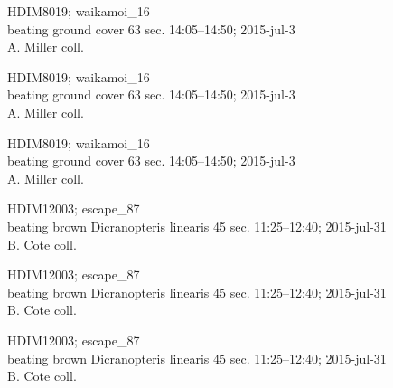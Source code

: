 \documentclass[2pt]{extarticle}
\begin{document}
\noindent
\parbox{0.16\textwidth}{\tiny \raggedright \rule[-0.3\baselineskip]{0pt}{10pt}HDIM8019; waikamoi\_16\\ beating ground cover 63 sec. 14:05--14:50; 2015-jul-3\\ A. Miller coll.}
\parbox{0.16\textwidth}{\tiny \raggedright \rule[-0.3\baselineskip]{0pt}{10pt}HDIM8019; waikamoi\_16\\ beating ground cover 63 sec. 14:05--14:50; 2015-jul-3\\ A. Miller coll.}
\parbox{0.16\textwidth}{\tiny \raggedright \rule[-0.3\baselineskip]{0pt}{10pt}HDIM8019; waikamoi\_16\\ beating ground cover 63 sec. 14:05--14:50; 2015-jul-3\\ A. Miller coll.}
\parbox{0.16\textwidth}{\tiny \raggedright \rule[-0.3\baselineskip]{0pt}{10pt}HDIM12003; escape\_87\\ beating brown Dicranopteris linearis 45 sec. 11:25--12:40; 2015-jul-31\\ B. Cote coll.}
\parbox{0.16\textwidth}{\tiny \raggedright \rule[-0.3\baselineskip]{0pt}{10pt}HDIM12003; escape\_87\\ beating brown Dicranopteris linearis 45 sec. 11:25--12:40; 2015-jul-31\\ B. Cote coll.}
\parbox{0.16\textwidth}{\tiny \raggedright \rule[-0.3\baselineskip]{0pt}{10pt}HDIM12003; escape\_87\\ beating brown Dicranopteris linearis 45 sec. 11:25--12:40; 2015-jul-31\\ B. Cote coll.} \\ 
\vspace{0.001in} 
\end{document}
